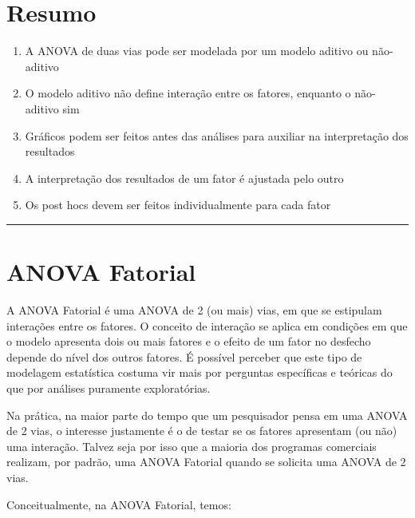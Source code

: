 \documentclass[
]{book}
\providecommand{\tightlist}{%
  \setlength{\itemsep}{0pt}\setlength{\parskip}{0pt}}
\begin{document}
\hypertarget{resumo-10}{%
\section{Resumo}\label{resumo-10}}

\begin{enumerate}
\def\labelenumi{\arabic{enumi}.}
\tightlist
\item
  A ANOVA de duas vias pode ser modelada por um modelo aditivo ou não-aditivo
\item
  O modelo aditivo não define interação entre os fatores, enquanto o não-aditivo sim\\
\item
  Gráficos podem ser feitos antes das análises para auxiliar na interpretação dos resultados\\
\item
  A interpretação dos resultados de um fator é ajustada pelo outro\\
\item
  Os post hocs devem ser feitos individualmente para cada fator\\
\end{enumerate}

\begin{center}\rule{0.5\linewidth}{0.5pt}\end{center}

\hypertarget{anova-fatorial}{%
\section{ANOVA Fatorial}\label{anova-fatorial}}

A ANOVA Fatorial é uma ANOVA de 2 (ou mais) vias, em que se estipulam interações entre os fatores. O conceito de interação se aplica em condições em que o modelo apresenta dois ou mais fatores e o efeito de um fator no desfecho depende do nível dos outros fatores. É possível perceber que este tipo de modelagem estatística costuma vir mais por perguntas específicas e teóricas do que por análises puramente exploratórias.

Na prática, na maior parte do tempo que um pesquisador pensa em uma ANOVA de 2 vias, o interesse justamente é o de testar se os fatores apresentam (ou não) uma interação. Talvez seja por isso que a maioria dos programas comerciais realizam, por padrão, uma ANOVA Fatorial quando se solicita uma ANOVA de 2 vias.

Conceitualmente, na ANOVA Fatorial, temos:
\end{document}

